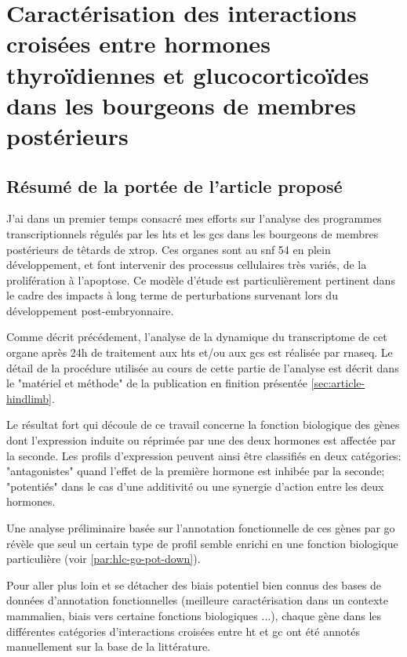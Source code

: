 \documentclass[../main.tex]{subfiles}
\begin{document}
\chapter{Caractérisation des interactions croisées entre hormones thyroïdiennes et glucocorticoïdes dans les bourgeons de membres postérieurs}



\section{Résumé de la portée de l'article proposé}

J'ai dans un premier temps consacré mes efforts sur l'analyse des programmes transcriptionnels régulés par les \glspl{ht} et les \glspl{gc} dans les bourgeons de membres postérieurs de têtards de \gls{xtrop}.
Ces organes sont au \gls{snf} 54 en plein développement, et font intervenir des processus cellulaires très variés, de la prolifération à l'apoptose.
Ce modèle d'étude est particulièrement pertinent dans le cadre des impacts à long terme de perturbations survenant lors du développement post-embryonnaire.

Comme décrit précédement, l'analyse de la dynamique du transcriptome de cet organe après 24h de traitement aux \glspl{ht} et/ou aux \glspl{gc} est réalisée par \gls{rnaseq}.
Le détail de la procédure utilisée au cours de cette partie de l'analyse est décrit dans le "matériel et méthode" de la publication en finition présentée \autoref{sec:article-hindlimb}.

Le résultat fort qui découle de ce travail concerne la fonction biologique des gènes dont l'expression induite ou réprimée par une des deux hormones est affectée par la seconde.
Les profils d'expression peuvent ainsi être classifiés en deux catégories:
"antagonistes" quand l'effet de la première hormone est inhibée par la seconde; "potentiés" dans le cas d'une additivité ou une synergie d'action entre les deux hormones.

Une analyse préliminaire basée sur l'annotation fonctionnelle de ces gènes par \gls{go} révèle que seul un certain type de profil semble enrichi en une fonction biologique particulière (voir \autoref{par:hlc-go-pot-down}).

Pour aller plus loin et se détacher des biais potentiel bien connus des bases de données d'annotation fonctionnelles (meilleure caractérisation dans un contexte mammalien, biais vers certaine fonctions biologiques ...), chaque gène dans les différentes catégories d'interactions croisées entre \gls{ht} et \gls{gc} ont été annotés manuellement sur la base de la littérature.
\end{document}
